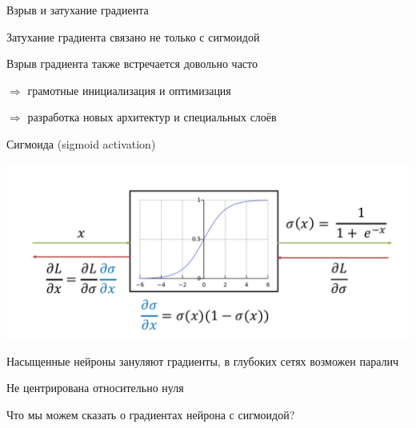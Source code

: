 \documentclass[notes,12pt, aspectratio=169]{beamer}
\newenvironment{wideitemize}{\itemize\addtolength{\itemsep}{10pt}}{\enditemize}
\begin{document}
\begin{frame}{Взрыв и затухание градиента}
	\begin{wideitemize}
		\item Затухание градиента связано не только с сигмоидой
		\item Взрыв градиента также встречается довольно часто 
		\item $\Rightarrow$ грамотные инициализация и оптимизация
		\item $\Rightarrow$ разработка новых архитектур и специальных слоёв
	\end{wideitemize}
\end{frame}


\begin{frame}{Сигмоида (sigmoid activation)}
\begin{center}
	\includegraphics[width=.65\linewidth]{sigmoid_activation_2.png}
\end{center}

\begin{itemize}
	{\color{red} 
		\item Насыщенные нейроны зануляют градиенты, в глубоких сетях возможен паралич
		\item Не центрирована относительно нуля
	}
		\item Что мы можем сказать о градиентах нейрона с сигмоидой? 
\end{itemize}
\end{frame}
\end{document}
